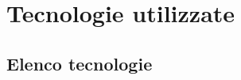 \chapter{Tecnologie utilizzate}
\label{chap:tecnologie_utilizzate}

\section{Elenco tecnologie}

\newpage